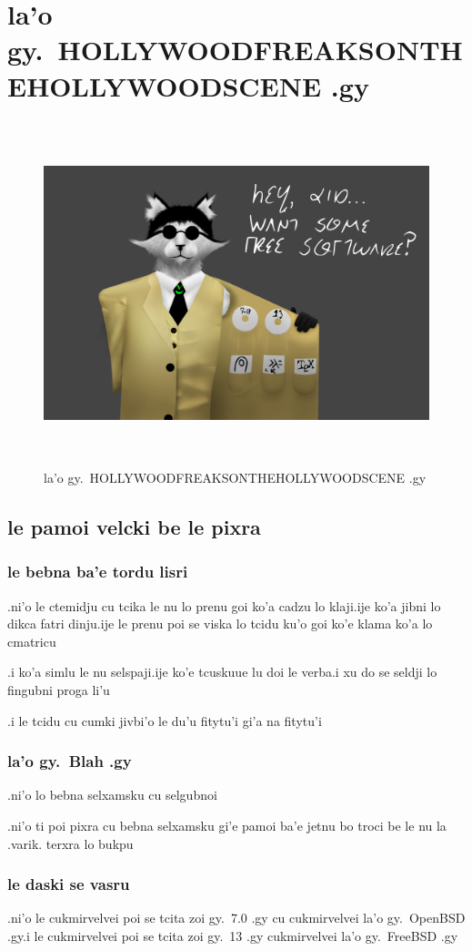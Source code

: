 \documentclass{report}
\newcommand\imageheight{10cm}
\begin{document}
\chapter{la'o gy.\ HOLLYWOODFREAKSONTHEHOLLYWOODSCENE .gy}
\begin{figure}[ht]
	\centering
	\includegraphics[height=\imageheight]{hollywoodfreaksonthehollywoodscene/hollywoodfreaksonthehollywoodscene.png}
	\caption[center]{la'o gy.\ HOLLYWOODFREAKSONTHEHOLLYWOODSCENE .gy}
\end{figure}
\section{le pamoi velcki be le pixra}
\subsection{le bebna ba'e tordu lisri}
.ni'o le ctemidju cu tcika le nu lo prenu goi ko'a cadzu lo klaji\@  .ije ko'a jibni lo dikca fatri dinju\@  .ije le prenu poi se viska lo tcidu ku'o goi ko'e klama ko'a lo cmatricu

.i ko'a simlu le nu selspaji\@  .ije ko'e tcuskuue lu doi le verba\@  .i xu do se seldji lo fingubni proga li'u

.i le tcidu cu cumki jivbi'o le du'u fitytu'i gi'a na fitytu'i
\subsection{la'o gy.\ Blah .gy}
.ni'o lo bebna selxamsku cu selgubnoi

.ni'o ti poi pixra cu bebna selxamsku gi'e pamoi ba'e jetnu bo troci be le nu la .varik. terxra lo bukpu
\subsection{le daski se vasru}
.ni'o le cukmirvelvei poi se tcita zoi gy.\ 7.0 .gy cu cukmirvelvei la'o gy.\ OpenBSD .gy\@  .i le cukmirvelvei poi se tcita zoi gy.\ 13 .gy cukmirvelvei la'o gy.\ FreeBSD .gy
\end{document}
